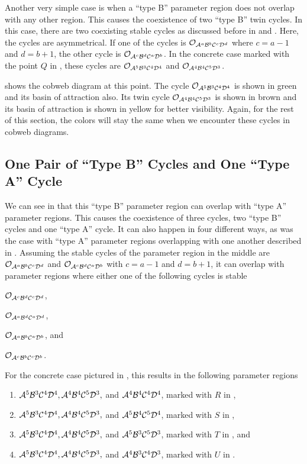Another very simple case is when a ``type B'' parameter region does not overlap with any other region.
This causes the coexistence of two ``type B'' twin cycles.
In this case, there are two coexisting stable cycles as discussed before in  and .
Here, the cycles are asymmetrical.
If one of the cycles is $\mathcal{O}_{\mathcal{A}^a\mathcal{B}^b\mathcal{C}^c\mathcal{D}^d}$ where $c = a - 1$ and $d = b + 1$, the other cycle is $\mathcal{O}_{\mathcal{A}^c\mathcal{B}^d\mathcal{C}^a\mathcal{D}^b}$.
In the concrete case marked with the point $Q$ in , these cycles are $\mathcal{O}_{\mathcal{A}^5\mathcal{B}^3\mathcal{C}^4\mathcal{D}^4}$ and $\mathcal{O}_{\mathcal{A}^4\mathcal{B}^4\mathcal{C}^5\mathcal{D}^3}$.

 shows the cobweb diagram at this point.
The cycle $\mathcal{O}_{\mathcal{A}^5\mathcal{B}^3\mathcal{C}^4\mathcal{D}^4}$ is shown in green and its basin of attraction also.
Its twin cycle $\mathcal{O}_{\mathcal{A}^4\mathcal{B}^4\mathcal{C}^5\mathcal{D}^3}$ is shown in brown and its basin of attraction is shown in yellow for better visibility.
Again, for the rest of this section, the colors will stay the same when we encounter these cycles in cobweb diagrams.

\subsection{One Pair of ``Type B'' Cycles and One ``Type A'' Cycle}
\label{sec:arch.coex.AB}

We can see in  that this ``type B'' parameter region can overlap with ``type A'' parameter regions.
This causes the coexistence of three cycles, two ``type B'' cycles and one ``type A'' cycle.
It can also happen in four different ways, as was the case with ``type A'' parameter regions overlapping with one another described in .
Assuming the stable cycles of the parameter region in the middle are $\mathcal{O}_{\mathcal{A}^a\mathcal{B}^b\mathcal{C}^c\mathcal{D}^d}$ and $\mathcal{O}_{\mathcal{A}^c\mathcal{B}^d\mathcal{C}^a\mathcal{D}^b}$ with $c = a - 1$ and $d = b + 1$, it can overlap with parameter regions where either one of the following cycles is stable
\begin{enumerate*}
	\item $\mathcal{O}_{\mathcal{A}^c\mathcal{B}^d\mathcal{C}^c\mathcal{D}^d}$,
	\item $\mathcal{O}_{\mathcal{A}^a\mathcal{B}^d\mathcal{C}^a\mathcal{D}^d}$,
	\item $\mathcal{O}_{\mathcal{A}^a\mathcal{B}^b\mathcal{C}^a\mathcal{D}^b}$, and
	\item $\mathcal{O}_{\mathcal{A}^c\mathcal{B}^b\mathcal{C}^c\mathcal{D}^b}$.
\end{enumerate*}
For the concrete case pictured in , this results in the following parameter regions
\begin{enumerate}
	\item $\mathcal{A}^5\mathcal{B}^3\mathcal{C}^4\mathcal{D}^4, \mathcal{A}^4\mathcal{B}^4\mathcal{C}^5\mathcal{D}^3,$ and $\mathcal{A}^4\mathcal{B}^4\mathcal{C}^4\mathcal{D}^4$, marked with $R$ in ,
	\item $\mathcal{A}^5\mathcal{B}^3\mathcal{C}^4\mathcal{D}^4, \mathcal{A}^4\mathcal{B}^4\mathcal{C}^5\mathcal{D}^3,$ and $\mathcal{A}^5\mathcal{B}^4\mathcal{C}^5\mathcal{D}^4$, marked with $S$ in ,
	\item $\mathcal{A}^5\mathcal{B}^3\mathcal{C}^4\mathcal{D}^4, \mathcal{A}^4\mathcal{B}^4\mathcal{C}^5\mathcal{D}^3,$ and $\mathcal{A}^5\mathcal{B}^3\mathcal{C}^5\mathcal{D}^3$, marked with $T$ in , and
	\item $\mathcal{A}^5\mathcal{B}^3\mathcal{C}^4\mathcal{D}^4, \mathcal{A}^4\mathcal{B}^4\mathcal{C}^5\mathcal{D}^3,$ and $\mathcal{A}^4\mathcal{B}^3\mathcal{C}^4\mathcal{D}^3$, marked with $U$ in .
\end{enumerate}

